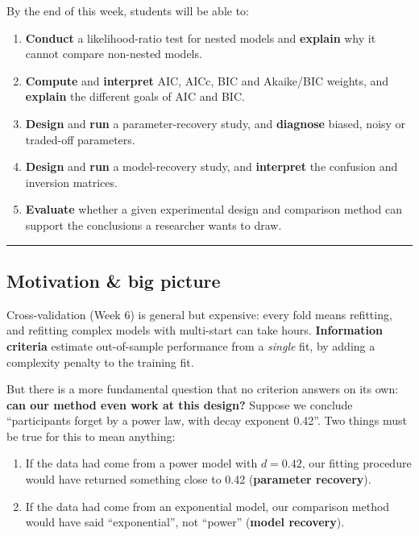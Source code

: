 By the end of this week, students will be able to:

\begin{enumerate}
\def\labelenumi{\arabic{enumi}.}
\tightlist
\item
  \textbf{Conduct} a likelihood-ratio test for nested models and
  \textbf{explain} why it cannot compare non-nested models.
\item
  \textbf{Compute} and \textbf{interpret} AIC, AICc, BIC and Akaike/BIC
  weights, and \textbf{explain} the different goals of AIC and BIC.
\item
  \textbf{Design} and \textbf{run} a parameter-recovery study, and
  \textbf{diagnose} biased, noisy or traded-off parameters.
\item
  \textbf{Design} and \textbf{run} a model-recovery study, and
  \textbf{interpret} the confusion and inversion matrices.
\item
  \textbf{Evaluate} whether a given experimental design and comparison
  method can support the conclusions a researcher wants to draw.
\end{enumerate}

\begin{center}\rule{0.5\linewidth}{0.5pt}\end{center}

\subsection{Motivation \& big picture}

Cross-validation (Week 6) is general but expensive: every fold means
refitting, and refitting complex models with multi-start can take hours.
\textbf{Information criteria} estimate out-of-sample performance from a
\emph{single} fit, by adding a complexity penalty to the training fit.

But there is a more fundamental question that no criterion answers on
its own: \textbf{can our method even work at this design?} Suppose we
conclude ``participants forget by a power law, with decay exponent
0.42''. Two things must be true for this to mean anything:

\begin{enumerate}
\def\labelenumi{\arabic{enumi}.}
\tightlist
\item
  If the data had come from a power model with \(d = 0.42\), our fitting
  procedure would have returned something close to 0.42
  (\textbf{parameter recovery}).
\item
  If the data had come from an exponential model, our comparison method
  would have said ``exponential'', not ``power'' (\textbf{model
  recovery}).
\end{enumerate}

